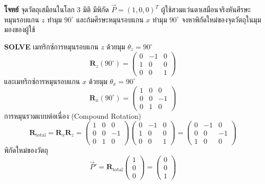 \begin{mathexample}
\textbf{โจทย์} จุดวัตถุเสมือนในโลก 3 มิติ มีพิกัด $\vec{P} = (1, 0, 0)^T$ ผู้ใช้สวมแว่นตาเสมือนจริงหันศีรษะหมุนรอบแกน $z$ ทำมุม $90^\circ$ และก้มศีรษะหมุนรอบแกน $x$ ทำมุม $90^\circ$ จงหาพิกัดใหม่ของจุดวัตถุในมุมมองของผู้ใช้

\vspace{0.2cm}
\textbf{SOLVE} เมทริกซ์การหมุนรอบแกน $z$ ด้วยมุม $\theta_z = 90^\circ$
\begin{equation}
\mathbf{R}_z(90^\circ) = \begin{pmatrix} 0 & -1 & 0 \\ 1 & 0 & 0 \\ 0 & 0 & 1 \end{pmatrix}
\end{equation}
และเมทริกซ์การหมุนรอบแกน $x$ ด้วยมุม $\theta_x = 90^\circ$
\begin{equation}
\mathbf{R}_x(90^\circ) = \begin{pmatrix} 1 & 0 & 0 \\ 0 & 0 & -1 \\ 0 & 1 & 0 \end{pmatrix}
\end{equation}
การหมุนรวมแบบต่อเนื่อง (Compound Rotation)
\begin{equation}
\mathbf{R}_{\text{total}} = \mathbf{R}_x \mathbf{R}_z = \begin{pmatrix} 1 & 0 & 0 \\ 0 & 0 & -1 \\ 0 & 1 & 0 \end{pmatrix} \begin{pmatrix} 0 & -1 & 0 \\ 1 & 0 & 0 \\ 0 & 0 & 1 \end{pmatrix} = \begin{pmatrix} 0 & -1 & 0 \\ 0 & 0 & -1 \\ 1 & 0 & 0 \end{pmatrix}
\end{equation}
พิกัดใหม่ของวัตถุ
\begin{equation}
\vec{P}' = \mathbf{R}_{\text{total}} \begin{pmatrix} 1 \\ 0 \\ 0 \end{pmatrix} = \begin{pmatrix} 0 \\ 0 \\ 1 \end{pmatrix}
\end{equation}


\end{mathexample}
